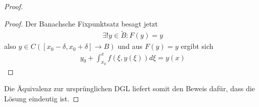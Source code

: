 \begin{theorem}
\begin{proof}
\begin{enum-arab}
\begin{proof}
					Der Banachsche Fixpunktsatz besagt jetzt
					\begin{align*}
						\exists! y \in \tilde B : F(y) = y
					\end{align*}
					also $y \in C([x_0-\delta, x_0+\delta] \to B)$ und aus $F(y) = y$ ergibt sich
					\begin{align*}
						y_0  + \int_{x_0}^x f(\xi, y(\xi)) d \xi = y(x)
					\end{align*}
				\end{proof}
		\end{enum-arab}
		Die Äquivalenz zur ursprünglichen DGL liefert somit den Beweis dafür, dass die Lösung eindeutig ist.
	\end{proof}
\end{theorem}



